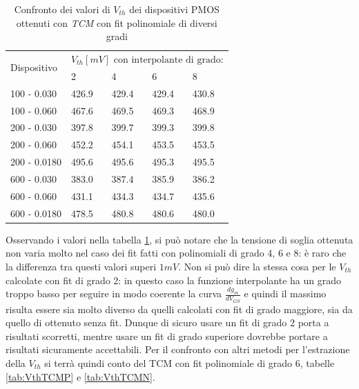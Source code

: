\documentclass[
	a4paper,
	cleardoublepage=empty,
	headings=twolinechapter,
	numbers=autoenddot,
]{scrbook}
\begin{document}
\begin{table}[h]
  \renewcommand{\arraystretch}{1.3}
  \centering
  \begin{tabular}{m{2.1cm} m{2cm} m{2cm} m{2cm} m{2cm}}
    \toprule
    \multirow{2}{*}{Dispositivo} & \multicolumn{4}{c}{$V_{th} [mV] \text{ con interpolante di grado:}$}                         \\
    \cmidrule{2-5}
                                 & 2                                                                    & 4     & 6     & 8     \\
    \midrule
    100 - 0.030                     & 426.9                                                                & 429.4 & 429.4 & 430.8 \\
    \hline
    100 - 0.060                     & 467.6                                                                & 469.5 & 469.3 & 468.9 \\
    \hline
    200 - 0.030                     & 397.8                                                                & 399.7 & 399.3 & 399.8 \\
    \hline
    200 - 0.060                     & 452.2                                                                & 454.1 & 453.5 & 453.5 \\
    \hline
    200 - 0.0180                    & 495.6                                                                & 495.6 & 495.3 & 495.5 \\
    \hline
    600 - 0.030                     & 383.0                                                                & 387.4 & 385.9 & 386.2 \\
    \hline
    600 - 0.060                     & 431.1                                                                & 434.3 & 434.7 & 435.6 \\
    \hline
    600 - 0.0180                    & 478.5                                                                & 480.8 & 480.6 & 480.0 \\

    \bottomrule
  \end{tabular}
  \caption{Confronto dei valori di $V_{th}$ dei dispositivi PMOS ottenuti con \emph{TCM} con fit polinomiale di diversi gradi}
  \label{tab:GradiTCM}
\end{table}

Osservando i valori nella tabella \ref{tab:GradiTCM}, si può notare che la tensione di soglia ottenuta non varia molto nel caso dei fit fatti con polinomiali di grado 4, 6 e 8: è raro che la differenza tra questi valori superi $1 mV$. Non si può dire la stessa cosa per le $V_{th}$ calcolate con fit di grado 2: in questo caso la funzione interpolante ha un grado troppo basso per seguire in modo coerente la curva $\frac{dg_m}{dV_{GS}}$ e quindi il massimo risulta essere sia molto diverso da quelli calcolati con fit di grado maggiore, sia da quello di ottenuto senza fit. Dunque di sicuro usare un fit di grado 2 porta a risultati scorretti, mentre usare un fit di grado superiore dovrebbe portare a risultati sicuramente accettabili. Per il confronto con altri metodi per l'estrazione della $V_{th}$ si terrà quindi conto del TCM con fit polinomiale di grado 6, tabelle \ref{tab:VthTCMP} e \ref{tab:VthTCMN}.
\end{document}
